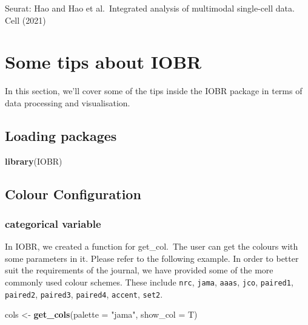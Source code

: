 \documentclass[
  12pt,
]{book}
\newenvironment{Shaded}{\begin{snugshade}}{\end{snugshade}}
\newcommand{\AttributeTok}[1]{\textcolor[rgb]{0.13,0.29,0.53}{#1}}
\newcommand{\FunctionTok}[1]{\textcolor[rgb]{0.13,0.29,0.53}{\textbf{#1}}}
\newcommand{\NormalTok}[1]{#1}
\newcommand{\OtherTok}[1]{\textcolor[rgb]{0.56,0.35,0.01}{#1}}
\newcommand{\StringTok}[1]{\textcolor[rgb]{0.31,0.60,0.02}{#1}}
\begin{document}
Seurat: Hao and Hao et al.~Integrated analysis of multimodal single-cell data. Cell (2021)

\hypertarget{some-tips-about-iobr}{%
\chapter{\texorpdfstring{\textbf{Some tips about IOBR}}{Some tips about IOBR}}\label{some-tips-about-iobr}}

In this section, we'll cover some of the tips inside the IOBR package in terms of data processing and visualisation.

\hypertarget{loading-packages-8}{%
\section{Loading packages}\label{loading-packages-8}}

\begin{Shaded}
\begin{Highlighting}[]
\FunctionTok{library}\NormalTok{(IOBR)}
\end{Highlighting}
\end{Shaded}

\hypertarget{colour-configuration}{%
\section{Colour Configuration}\label{colour-configuration}}

\hypertarget{categorical-variable}{%
\subsection{categorical variable}\label{categorical-variable}}

In IOBR, we created a function for get\_col.~The user can get the colours with some parameters in it. Please refer to the following example. In order to better suit the requirements of the journal, we have provided some of the more commonly used colour schemes. These include \texttt{nrc}, \texttt{jama}, \texttt{aaas}, \texttt{jco}, \texttt{paired1}, \texttt{paired2}, \texttt{paired3}, \texttt{paired4}, \texttt{accent}, \texttt{set2}.

\begin{Shaded}
\begin{Highlighting}[]
\NormalTok{cols }\OtherTok{\textless{}{-}} \FunctionTok{get\_cols}\NormalTok{(}\AttributeTok{palette =} \StringTok{"jama"}\NormalTok{, }\AttributeTok{show\_col =}\NormalTok{ T)}
\end{Highlighting}
\end{Shaded}
\end{document}
